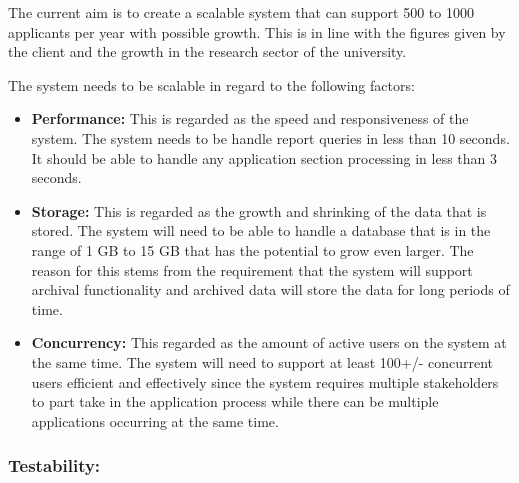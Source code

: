 \documentclass[12pt]{article}
\begin{document}
\begin{flushleft}

The current aim is to create a scalable system that can support 500 to 1000 applicants per year with possible growth. This is in line with the figures given by the client and the growth in the research sector of the university.\\
\vspace{0.05in}

The system needs to be scalable in regard to the following factors:
\begin{itemize}


\item\textbf{Performance:} This is regarded as the speed and responsiveness of the system.
The system needs to be handle report queries in less than 10 seconds. It should be able to handle any application section processing in less than 3 seconds.\\

\item\textbf{Storage:} This is regarded as the growth and shrinking of the data that is stored.
The system will need to be able to handle a database that is in the range of 1 GB to 15 GB that has the potential to grow even larger. The reason for this stems from the requirement that the system will support archival functionality and archived data will store the data for long periods of time.\\

\item\textbf{Concurrency:} This regarded as the amount of active users on the system at the same time.
The system will need to support at least 100+/- concurrent users efficient and effectively since the system requires multiple stakeholders to part take in the application process while there can be multiple applications occurring at the same time.\\

\end{itemize}
\end{flushleft}
\vspace{0.1in}

\subsubsection{Testability:}
\end{document}
